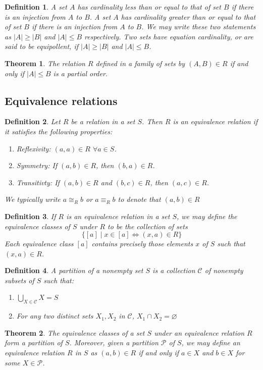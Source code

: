 \documentclass[a4paper]{article}
\newtheorem{mytheorem}{Theorem}
\newtheorem{mydef}{Definition}
\numberwithin{mytheorem}{section}
\numberwithin{mydef}{section}
\numberwithin{axiom}{section}
\numberwithin{example}{section}
\begin{document}
\begin{mydef} A set $A$ has cardinality less than or equal to that of set $B$ if there is an injection from $A$ to $B$. A set $A$ has cardinality greater than or equal to that of set $B$ if there is an injection from $A$ to $B$. We may write these two statements as $|A| \geq |B|$ and $|A| \leq B$ respectively. Two sets have equation cardinality, or are said to be equipollent, if $|A| \geq |B|$ and $|A| \leq B$. 
\end{mydef}

\begin{mytheorem} The relation $R$ defined in a family of sets by $(A,B) \in R$ if and only if $|A| \leq B$ is a partial order. 
\end{mytheorem}




\subsection{Equivalence relations}

\begin{mydef}Let $R$ be a relation in a set $S$. Then $R$ is an equivalence relation if it satisfies the following properties:
 \begin{enumerate}
 \item Reflexivity: $(a,a) \in R$ $\forall a \in S$. 
 \item Symmetry: If $(a,b) \in R$, then $(b,a) \in R$.
 \item Transitivty: If $(a,b) \in R$ and $(b,c) \in R$, then $(a,c) \in R$.
 \end{enumerate}
We typically write $a \cong_{R} b$ or $a \equiv_{R} b$ to denote that $(a,b) \in R$ 
\end{mydef}

\begin{mydef}If $R$ is an equivalence relation in a set $S$, we may define the equivalence classes of $S$ under $R$ to be the collection of sets $$ \bigl\{ [a] \mid x \in [a] \iff (x,a) \in R \bigr\} $$ Each equivalence class $[a]$ contains precisely those elements $x$ of $S$ such that $(x,a) \in R$.
\end{mydef}

\begin{mydef}A partition of a nonempty set $S$ is a collection $\mathcal{C}$ of nonempty subsets of $S$ such that:
 \begin{enumerate}
 \item $\bigcup\limits_{X \in \mathcal{C}} X = S$
  \item For any two distinct sets $X_{1},X_{2}$ in $\mathcal{C}$, $X_{1} \cap X_{2} = \varnothing $
 \end{enumerate}
\end{mydef}

\begin{mytheorem} The equivalence classes of a set $S$ under an equivalence relation $R$ form a partition of $S$. Moreover, given a partition $\mathcal{P}$ of $S$, we may define an equivalence relation $R$ in $S$ as $(a,b) \in R$ if and only if $a \in X$ and $b \in X$ for some $X \in \mathcal{P}$. 
\end{mytheorem}




\end{document}
